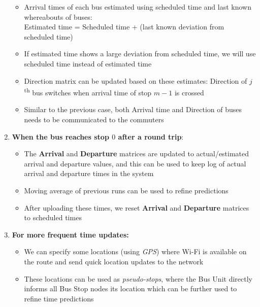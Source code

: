 \begin{enumerate}
          \begin{itemize}
              \item Arrival times of each bus estimated using scheduled time and last known whereabouts of buses:\\
                    Estimated time = Scheduled time + (last known deviation from scheduled
                    time)
              \item If estimated time shows a large deviation from scheduled time, we will use scheduled time instead of estimated time
              \item Direction matrix can be updated based on these estimates: Direction of $j$\textsuperscript{th} bus switches when arrival time of stop $m-1$ is crossed
              \item Similar to the previous case, both Arrival time and Direction of buses needs to be communicated to the commuters
          \end{itemize}
    \item \textbf{When the bus reaches stop $0$ after a \gls{round trip}}:
          \begin{itemize}
              \item  The \textbf{Arrival} and \textbf{Departure} matrices are updated to actual/estimated arrival and departure values, and this can be used to keep log of actual arrival and departure times in the system
              \item Moving average of previous runs can be used to refine predictions
              \item  After uploading these times, we reset \textbf{Arrival} and \textbf{Departure} matrices to scheduled times
          \end{itemize}
    \item \textbf{For more frequent time updates:}
          \begin{itemize}
              \item We can specify some locations (using \textit{\gls{GPS}}) where \gls{Wi-Fi} is available on the route and send quick location updates to the network {\tiny \textcolor{white}{\ac{Wi-Fi}}}
              \item These locations can be used as \textit{pseudo-stops}, where the Bus Unit directly informs all Bus Stop nodes its location which can be further used to refine time predictions
          \end{itemize}
\end{enumerate}